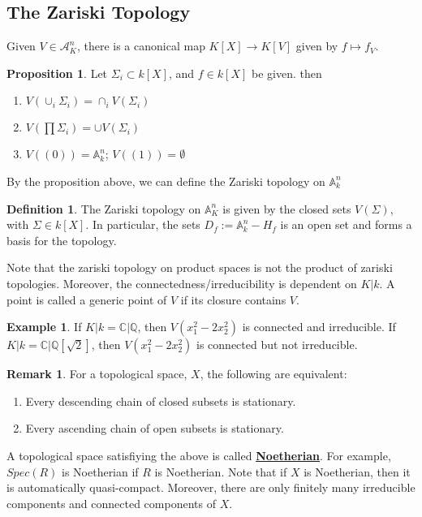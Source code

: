 \documentclass{article}
\theoremstyle{definition}
\theoremstyle{definition}
\newtheorem{definition}{Definition}[theorem]
\theoremstyle{definition}
\newtheorem{remark}{Remark}[theorem]
\theoremstyle{definition}
\newtheorem{proposition}{Proposition}[theorem]
\theoremstyle{definition}
\theoremstyle{definition}
\theoremstyle{definition}
\newtheorem{example}{Example}[theorem]
\begin{document}
\subsection{The Zariski Topology}
Given $V\in \mathcal{A}_K^n$, there is a canonical map $K[X]\to K[V]$ given by $f\mapsto f_V$. 
\begin{tcolorbox}[colback=blue!5!white,colframe=blue!30!white]
\begin{proposition}
Let $\Sigma_i\subset k[X]$, and $f\in k[X]$ be given. then
\begin{enumerate}
    \item $V(\cup_i \Sigma_i)=\cap_i V(\Sigma_i)$
    \item $V(\prod \Sigma_i)=\cup V(\Sigma_i)$
    \item $V((0))= \mathbb{A}_k^n$; $V((1))=\emptyset$
\end{enumerate}
\end{proposition}
\end{tcolorbox}

By the proposition above, we can define the Zariski topology on $\mathbb{A}_k^n$

\begin{tcolorbox}[colback=purple!5!white,colframe=purple!75!black]
\begin{definition}
The Zariski topology on $\mathbb{A}_K^n$ is given by the closed sets $V(\Sigma)$, with $\Sigma\in k[X]$. In particular, the sets $D_f:=\mathbb{A}_k^n-H_f$ is an open set and forms a basis for the topology. 
\end{definition}
\end{tcolorbox}
Note that the zariski topology on product spaces is not the product of zariski topologies. Moreover, the connectedness/irreducibility is dependent on $K|k$. A point is called a generic point of $V$ if its closure contains $V$. 


\begin{tcolorbox}[colback=yellow!5!white,colframe=yellow!30!white]
\begin{example}
If $K|k=\mathbb{C}|\mathbb{Q}$, then $V(x_1^2-2x_2^2)$ is connected and irreducible. If $K|k=\mathbb{C}|\mathbb{Q}[\sqrt{2}]$, then $V(x_1^2-2x_2^2)$ is connected but not irreducible.
\end{example}
\end{tcolorbox}

\begin{tcolorbox}[colback=green!5!white,colframe=green!30!white]
\begin{remark}
For a topological space, $X$, the following are equivalent:
\begin{enumerate}
    \item Every descending chain of closed subsets is stationary. 
    \item Every ascending chain of open subsets is stationary.
\end{enumerate}
A topological space satisfiying the above is called \underline{\textbf{Noetherian}}. For example, $Spec(R)$ is Noetherian if $R$ is Noetherian. Note that if $X$ is Noetherian, then it is automatically quasi-compact. Moreover, there are only finitely many irreducible components and connected components of $X$. 
\end{remark}
\end{tcolorbox}
\end{document}
